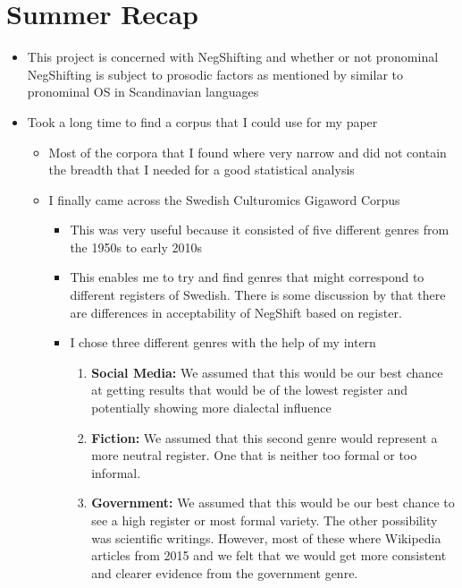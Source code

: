 \documentclass[12pt, letterpaper]{article}
\begin{document}
\section*{Summer Recap}
\begin{itemize}
	\item This project is concerned with NegShifting and whether or not pronominal NegShifting is subject to prosodic factors as mentioned by \citet{penkaNegativeIndefinites2011} similar to pronominal OS in Scandinavian languages

	\item Took a long time to find a corpus that I could use for my paper
	\begin{itemize}
		\item Most of the corpora that I found where very narrow and did not contain the breadth that I needed for a good statistical analysis
		\item  I finally came across the Swedish Culturomics Gigaword Corpus \citep{eideSwedishCulturomicsGigaword2016} 
		\begin{itemize}
			\item This was very useful because it consisted of five different genres from the 1950s to early 2010s
			\item This enables me to try and find genres that might correspond to different registers of Swedish. There is some discussion by \citet{engelsScandinavianNegativeIndefinites2012} that there are differences in acceptability of NegShift based on register.
			\item I chose three different genres with the help of my intern
			\begin{enumerate}
				\item \textbf{Social Media:} We assumed that this would be our best chance at getting results that would be of the lowest register and potentially showing more dialectal influence
				\item \textbf{Fiction:} We assumed that this second genre would represent a more neutral register. One that is neither too formal or too informal.
				\item  \textbf{Government:} We assumed that this would be our best chance to see a high register or most formal variety. The other possibility was scientific writings. However, most of these where Wikipedia articles from 2015 and we felt that we would get more consistent and clearer evidence from the government genre.
			\end{enumerate}
		\end{itemize}
	\end{itemize}
	

\end{itemize}
\end{document}
